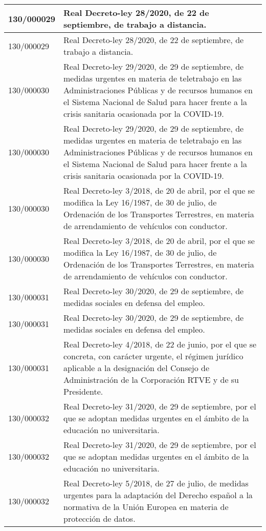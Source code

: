 {\begin{table}[H]
\begin{center}
\begin{tabularx}{\linewidth}{| l | X |}
\hline
130/000029 & Real Decreto-ley 28/2020, de 22 de septiembre, de trabajo a distancia. \\
\hline
130/000029 & Real Decreto-ley 28/2020, de 22 de septiembre, de trabajo a distancia. \\
\hline
130/000030 & Real Decreto-ley 29/2020, de 29 de septiembre, de medidas urgentes en materia de teletrabajo en las Administraciones Públicas y de recursos humanos en el Sistema Nacional de Salud para hacer frente a la crisis sanitaria ocasionada por la COVID-19. \\
\hline
130/000030 & Real Decreto-ley 29/2020, de 29 de septiembre, de medidas urgentes en materia de teletrabajo en las Administraciones Públicas y de recursos humanos en el Sistema Nacional de Salud para hacer frente a la crisis sanitaria ocasionada por la COVID-19. \\
\hline
130/000030 & Real Decreto-ley 3/2018, de 20 de abril, por el que se modifica la Ley 16/1987, de 30 de julio, de Ordenación de los Transportes Terrestres, en materia de arrendamiento de vehículos con conductor. \\
\hline
130/000030 & Real Decreto-ley 3/2018, de 20 de abril, por el que se modifica la Ley 16/1987, de 30 de julio, de Ordenación de los Transportes Terrestres, en materia de arrendamiento de vehículos con conductor. \\
\hline
130/000031 & Real Decreto-ley 30/2020, de 29 de septiembre, de medidas sociales en defensa del empleo. \\
\hline
130/000031 & Real Decreto-ley 30/2020, de 29 de septiembre, de medidas sociales en defensa del empleo. \\
\hline
130/000031 & Real Decreto-ley 4/2018, de 22 de junio, por el que se concreta, con carácter urgente, el régimen jurídico aplicable a la designación del Consejo de Administración de la Corporación RTVE y de su Presidente. \\
\hline
130/000032 & Real Decreto-ley 31/2020, de 29 de septiembre, por el que se adoptan medidas urgentes en el ámbito de la educación no universitaria. \\
\hline
130/000032 & Real Decreto-ley 31/2020, de 29 de septiembre, por el que se adoptan medidas urgentes en el ámbito de la educación no universitaria. \\
\hline
130/000032 & Real Decreto-ley 5/2018, de 27 de julio, de medidas urgentes para la adaptación del Derecho español a la normativa de la Unión Europea en materia de protección de datos. \\

\end{tabularx}
\end{center}
\end{table}}
